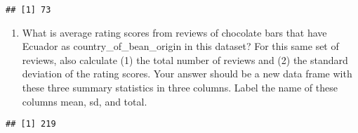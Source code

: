 \documentclass[
]{article}
\newenvironment{Shaded}{\begin{snugshade}}{\end{snugshade}}
\newcommand{\FunctionTok}[1]{\textcolor[rgb]{0.13,0.29,0.53}{\textbf{#1}}}
\newcommand{\NormalTok}[1]{#1}
\newcommand{\OtherTok}[1]{\textcolor[rgb]{0.56,0.35,0.01}{#1}}
\newcommand{\SpecialCharTok}[1]{\textcolor[rgb]{0.81,0.36,0.00}{\textbf{#1}}}
\newcommand{\StringTok}[1]{\textcolor[rgb]{0.31,0.60,0.02}{#1}}
\providecommand{\tightlist}{%
  \setlength{\itemsep}{0pt}\setlength{\parskip}{0pt}}
\begin{document}
\begin{Shaded}
\end{Shaded}

\begin{verbatim}
## [1] 73
\end{verbatim}

\begin{enumerate}
\def\labelenumi{\arabic{enumi}.}
\setcounter{enumi}{2}
\tightlist
\item
  What is average rating scores from reviews of chocolate bars that have
  Ecuador as country\_of\_bean\_origin in this dataset? For this same
  set of reviews, also calculate (1) the total number of reviews and (2)
  the standard deviation of the rating scores. Your answer should be a
  new data frame with these three summary statistics in three columns.
  Label the name of these columns mean, sd, and total.
\end{enumerate}

\begin{Shaded}
\end{Shaded}

\begin{verbatim}
## [1] 219
\end{verbatim}
\end{document}
